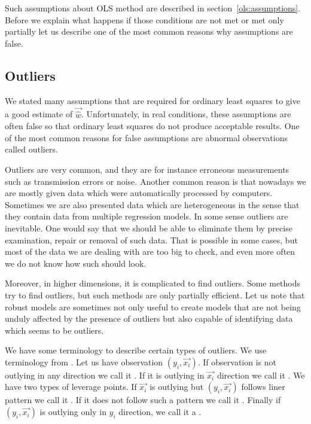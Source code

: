 Such assumptions about OLS method are described in section~\ref{ols:assumptions}. Before we explain what happens if those conditions are not met or met only partially let us describe one of the most common reasons why assumptions are false.

\subsection{Outliers}
We stated many assumptions that are required for ordinary least squares to give a good estimate of $\vec{\hat{w}}$. Unfortunately, in real conditions, these assumptions are often false so that ordinary least squares do not produce acceptable results. One of the most common reasons for false assumptions are abnormal observations called outliers.

Outliers are very common, and they are for instance erroneous measurements such as transmission errors or noise. Another common reason is that nowadays we are mostly given data which were automatically processed by computers. Sometimes we are also presented data which are heterogeneous in the sense that they contain data from multiple regression models. In some sense outliers are inevitable. One would say that we should be able to eliminate them by precise examination, repair or removal of such data. That is possible in some cases, but most of the data we are dealing with are too big to check, and even more often we do not know how such should look. 

Moreover, in higher dimensions, it is complicated to find outliers. Some methods try to find outliers, but such methods are only partially efficient. Let us note that robust models are sometimes not only useful to create models that are not being unduly affected by the presence of outliers but also capable of identifying data which seems to be outliers. 

We have some terminology to describe certain types of outliers. We use terminology from \cite{rouss:1990}. Let us have observation $(y_i, \vec{x_i})$. If observation is not outlying in any direction we call it  . If it is outlying in $\vec{x_i}$ direction we call it . We have two types of leverage points. If $\vec{x_i}$ is outlying but $(y_i, \vec{x_i})$ follows liner pattern we call it  . If it does not follow such a pattern we call it . Finally if $(y_i, \vec{x_i})$ is  outlying only in $y_i$  direction, we call it a .

